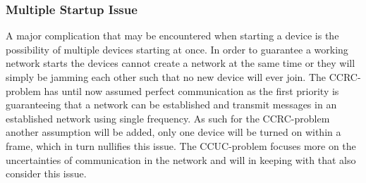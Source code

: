 \subsubsection*{Multiple Startup Issue}\label{msiCCRC}
A major complication that may be encountered when starting a device is the possibility of multiple devices starting at once.
In order to guarantee a working network starts the devices cannot create a network at the same time or they will simply be jamming each other such that no new device will ever join.
The CCRC-problem has until now assumed perfect communication as the first priority is guaranteeing that a network can be established and transmit messages in an established network using single frequency.
As such for the CCRC-problem another assumption will be added, only one device will be turned on within a frame, which in turn nullifies this issue.
The CCUC-problem focuses more on the uncertainties of communication in the network and will in keeping with that also consider this issue.